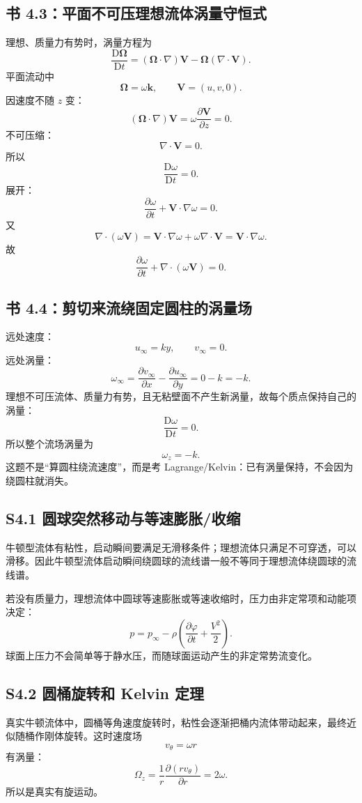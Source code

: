 \documentclass[UTF8,zihao=-4]{ctexart}
\newcommand{\D}{\mathrm D}
\begin{document}
\subsection*{书 4.3：平面不可压理想流体涡量守恒式}

理想、质量力有势时，涡量方程为
\[
\frac{\D\bm\Omega}{\D t}
=(\bm\Omega\cdot\nabla)\bm V-\bm\Omega(\nabla\cdot\bm V).
\]
平面流动中
\[
\bm\Omega=\omega\bm k,\qquad \bm V=(u,v,0).
\]
因速度不随 \(z\) 变：
\[
(\bm\Omega\cdot\nabla)\bm V
=\omega\frac{\partial\bm V}{\partial z}=0.
\]
不可压缩：
\[
\nabla\cdot\bm V=0.
\]
所以
\[
\frac{\D\omega}{\D t}=0.
\]
展开：
\[
\frac{\partial\omega}{\partial t}
+\bm V\cdot\nabla\omega=0.
\]
又
\[
\nabla\cdot(\omega\bm V)
=\bm V\cdot\nabla\omega+\omega\nabla\cdot\bm V
=\bm V\cdot\nabla\omega.
\]
故
\[
\boxed{
\frac{\partial\omega}{\partial t}
+\nabla\cdot(\omega\bm V)=0.}
\]

\subsection*{书 4.4：剪切来流绕固定圆柱的涡量场}

远处速度：
\[
u_\infty=ky,\qquad v_\infty=0.
\]
远处涡量：
\[
\omega_\infty
=\frac{\partial v_\infty}{\partial x}
-\frac{\partial u_\infty}{\partial y}
=0-k=-k.
\]
理想不可压流体、质量力有势，且无粘壁面不产生新涡量，故每个质点保持自己的涡量：
\[
\frac{\D\omega}{\D t}=0.
\]
所以整个流场涡量为
\[
\boxed{\omega_z=-k.}
\]
这题不是“算圆柱绕流速度”，而是考 Lagrange/Kelvin：已有涡量保持，不会因为绕圆柱就消失。

\subsection*{S4.1 圆球突然移动与等速膨胀/收缩}

牛顿型流体有粘性，启动瞬间要满足无滑移条件；理想流体只满足不可穿透，可以滑移。因此牛顿型流体启动瞬间绕圆球的流线谱一般不等同于理想流体绕圆球的流线谱。

若没有质量力，理想流体中圆球等速膨胀或等速收缩时，压力由非定常项和动能项决定：
\[
p=p_\infty-\rho\left(
\frac{\partial\varphi}{\partial t}
+\frac{V^2}{2}
\right).
\]
球面上压力不会简单等于静水压，而随球面运动产生的非定常势流变化。

\subsection*{S4.2 圆桶旋转和 Kelvin 定理}

真实牛顿流体中，圆桶等角速度旋转时，粘性会逐渐把桶内流体带动起来，最终近似随桶作刚体旋转。这时速度场
\[
v_\theta=\omega r
\]
有涡量：
\[
\Omega_z=\frac1r\frac{\partial(rv_\theta)}{\partial r}=2\omega.
\]
所以是真实有旋运动。
\end{document}
